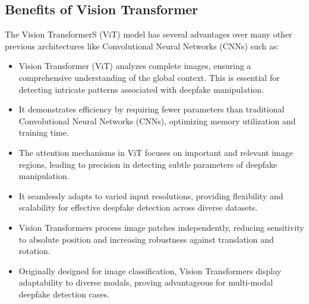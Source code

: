 \subsection{Benefits of Vision Transformer}

The Vision TransformerS (ViT) model has several advantages over many other previous architectures like Convolutional Neural Networks (CNNs) such as:

\begin{itemize}
    \item 
    Vision Transformer (ViT) analyzes complete images, ensuring a comprehensive understanding of the global context. This is essential for detecting intricate patterns associated with deepfake manipulation.
    
    \item It demonstrates efficiency by requiring fewer parameters than traditional Convolutional Neural Networks (CNNs), optimizing memory utilization and training time.
    
    \item The attention mechanisms in ViT focuses on important and relevant image regions, leading to precision in detecting subtle parameters of deepfake manipulation.
    
    \item It seamlessly adapts to varied input resolutions, providing flexibility and scalability for effective deepfake detection across diverse datasets.
    
    \item Vision Transformers process image patches independently, reducing sensitivity to absolute position and increasing robustness against translation and rotation.
    
    \item Originally designed for image classification, Vision Transformers display adaptability to diverse modals, proving advantageous for multi-modal deepfake detection cases.
    
\end{itemize}
\newpage

  